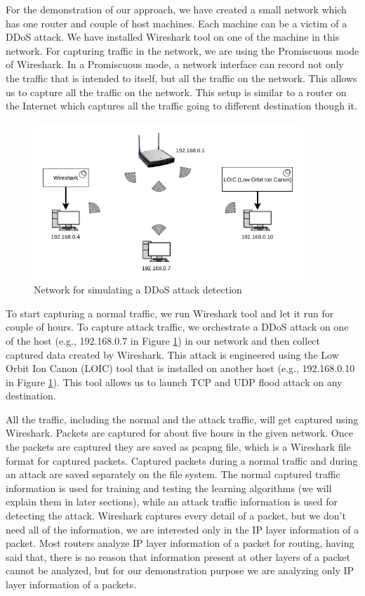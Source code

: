\documentclass[12pt,oneside,a4paper]{article}
\begin{document}
For the demonstration of our approach, we have created a small network which has one router and couple of host machines. Each machine can be a victim of a DDoS attack. We have installed Wireshark tool on one of the machine in this network. For capturing traffic in the network, we are using the Promiscuous mode of Wireshark. In a Promiscuous mode, a network interface can record not only the traffic that is intended to itself, but all the traffic on the network. This allows us to capture all the traffic on the network. This setup is similar to a router on the Internet which captures all the traffic going to different destination though it.

\begin{figure}[H]
\centering
\includegraphics[width=0.90\textwidth]{demo_network.png}
\caption{Network for simulating a DDoS attack detection} \label{fig:demonetwork}
\end{figure}

To start capturing a normal traffic, we run Wireshark tool and let it run for couple of hours. To capture attack traffic, we orchestrate a DDoS attack on one of the host (e.g., 192.168.0.7 in Figure \ref{fig:demonetwork}) in our network and then collect captured data created by Wireshark. This attack is engineered using the Low Orbit Ion Canon (LOIC) tool that is installed on another host (e.g., 192.168.0.10 in Figure \ref{fig:demonetwork}). This tool allows us to launch TCP and UDP flood attack on any destination.

All the traffic, including the normal and the attack traffic, will get captured using Wireshark. Packets are captured for about five hours in the given network. Once the packets are captured they are saved as pcapng file, which is a Wireshark file format for captured packets. Captured packets during a normal traffic and during an attack are saved separately on the file system. The normal captured traffic information is used for training and testing the learning algorithms (we will explain them in later sections), while an attack traffic  information is used for detecting the attack. Wireshark captures every detail of a packet, but we don't need all of the information, we are interested only in the IP layer information of a packet. Most routers analyze IP layer information of a packet for routing, having said that, there is no reason that information present at other layers of a packet cannot be analyzed, but for our demonstration purpose we are analyzing only IP layer information of a packets.\par
\end{document}

